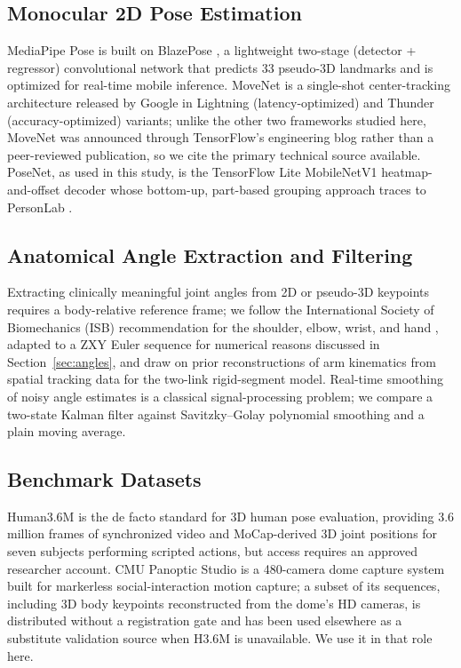 \documentclass[conference]{IEEEtran}
\begin{document}
\subsection{Monocular 2D Pose Estimation}
MediaPipe Pose is built on BlazePose \cite{bazarevsky2020blazepose}, a
lightweight two-stage (detector + regressor) convolutional network that
predicts 33 pseudo-3D landmarks and is optimized for real-time mobile
inference. MoveNet \cite{movenet2021blog} is a single-shot
center-tracking architecture released by Google in Lightning
(latency-optimized) and Thunder (accuracy-optimized) variants; unlike the
other two frameworks studied here, MoveNet was announced through
TensorFlow's engineering blog rather than a peer-reviewed publication, so
we cite the primary technical source available. PoseNet, as used in this
study, is the TensorFlow Lite MobileNetV1 heatmap-and-offset decoder
whose bottom-up, part-based grouping approach traces to PersonLab
\cite{papandreou2018personlab}.

\subsection{Anatomical Angle Extraction and Filtering}
Extracting clinically meaningful joint angles from 2D or pseudo-3D
keypoints requires a body-relative reference frame; we follow the
International Society of Biomechanics (ISB) recommendation for the
shoulder, elbow, wrist, and hand \cite{wu2005isb}, adapted to a ZXY
Euler sequence for numerical reasons discussed in
Section~\ref{sec:angles}, and draw on prior reconstructions of arm
kinematics from spatial tracking data \cite{biryukova2000kinematics} for
the two-link rigid-segment model. Real-time smoothing of noisy angle
estimates is a classical signal-processing problem; we compare a
two-state Kalman filter \cite{kalman1960new} against Savitzky--Golay
polynomial smoothing \cite{savitzky1964smoothing} and a plain moving
average.

\subsection{Benchmark Datasets}
Human3.6M \cite{ionescu2014human36m} is the de facto standard for 3D
human pose evaluation, providing 3.6 million frames of synchronized video
and MoCap-derived 3D joint positions for seven subjects performing
scripted actions, but access requires an approved researcher account.
CMU Panoptic Studio \cite{joo2015panoptic} is a 480-camera dome capture
system built for markerless social-interaction motion capture; a subset
of its sequences, including 3D body keypoints reconstructed from the
dome's HD cameras, is distributed without a registration gate and has
been used elsewhere as a substitute validation source when H3.6M is
unavailable. We use it in that role here.
\end{document}
